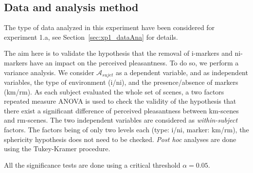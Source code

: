 \documentclass[twoside,twocolumn]{article}
\begin{document}
\subsection{Data and analysis method}


The type of data analyzed in this experiment have been considered for experiment 1.a, see Section~\ref{sec:xp1_dataAna} for details.


The aim here is to validate the hypothesis that the removal of i-markers and ni-markers have an impact on the perceived pleasantness. To do so, we perform a variance analysis. We consider $\mathcal{A}_{sujet}$ as a dependent variable, and as independent variables, the type of environment (i/ni), and the presence/absence of markers (km/rm). As each subject evaluated the whole set of scenes, a two factors repeated measure ANOVA is used to check the validity of the hypothesis that there exist a significant difference of perceived pleasantness between km-scenes and rm-scenes. The two independent variables are considered as \emph{within-subject} factors. The factors being of only two levels each (type: i/ni,  marker: km/rm), the sphericity hypothesis does not need to be checked. \emph{Post hoc} analyses are done using the Tukey-Kramer procedure.


All the significance tests are done using a critical threshold $\alpha=0.05$.
\end{document}
